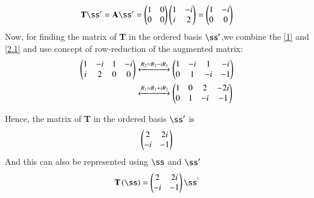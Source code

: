 \documentclass[journal,12pt,twocolumn]{IEEEtran}
\begin{document}
\begin{multline}
\textbf{T}\vec{\ss'}  = \vec{A}\ss'= \myvec{1 & 0 \\ 0 & 0 }\myvec{1 & -i \\ i & 2}=\myvec{ 1 & -i \\ 0 & 0} \label{2.1}
\end{multline}
Now, for finding the matrix of \textbf{T} in the ordered basis $\ss'$,we combine the \ref{1} and \ref{2.1}  and  use concept of row-reduction of  the augmented matrix:
\begin{align}
\begin{pmatrix}1&-i& 1 & -i \\ i& 2 & 0 & 0 \end{pmatrix} &\xleftrightarrow{R_2 = R_2 - iR_1}\begin{pmatrix}1&-i&1 & -i  \\ 0 &1 & -i & -1\end{pmatrix}\\
&\xleftrightarrow{R_1=R_1 +iR_2}\begin{pmatrix}1 &0&2 & -2i\\0 &1 &-i &-1 \\ \end{pmatrix}
\end{align}

Hence, the matrix of \textbf{T} in the ordered basis $\ss'$ is
\begin{align}
\begin{pmatrix}2 & 2i \\ -i & -1\end{pmatrix}
\end{align}
And this can also be represented using   $\ss$  and $\ss'$ 
\begin{align}
\textbf{T}\brak{\vec{\ss}}=\myvec{2&2i\\-i&-1}\vec{\ss^{'}}   
\end{align}
\end{document}

